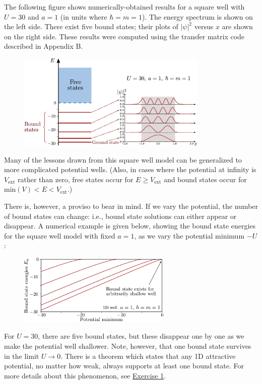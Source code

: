 \documentclass[pra,12pt]{revtex4}
\begin{document}
The following figure shows numerically-obtained results for a square
well with $U = 30$ and $a=1$ (in units where $\hbar = m =1$).  The
energy spectrum is shown on the left side.  There exist five bound
states; their plots of $|\psi|^2$ versus $x$ are shown on the right
side.  These results were computed using the transfer matrix code
described in Appendix B.

\begin{figure}[h]
  \centering\includegraphics[width=0.81\textwidth]{boundvsextended}
\end{figure}

Many of the lessons drawn from this square well model can be
generalized to more complicated potential wells.  (Also, in cases
where the potential at infinity is $V_{\textrm{ext}}$ rather than
zero, free states occur for $E \ge V_{\textrm{ext}}$ and bound states
occur for $\textrm{min}(V) < E < V_{\textrm{ext}}$.)

There is, however, a proviso to bear in mind.  If we vary the
potential, the number of bound states can change: i.e., bound state
solutions can either appear or disappear.  A numerical example is
given below, showing the bound state energies for the square well
model with fixed $a = 1$, as we vary the potential minimum $-U$:

\begin{figure}[h]
  \centering\includegraphics[width=0.65\textwidth]{boundstate1d}
\end{figure}

For $U = 30$, there are five bound states, but these disappear one by
one as we make the potential well shallower.  Note, however, that one
bound state survives in the limit $U \rightarrow 0$.  There is a
theorem which states that any 1D attractive potential, no matter how
weak, always supports at least one bound state.  For more details
about this phenomenon, see \hyperref[ex:boundstate]{Exercise 1}.
\end{document}
